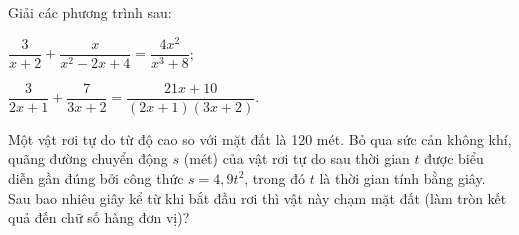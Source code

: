 \begin{practice}
\begin{questions}[series=SBT]
\begin{questions}
            \answerline
            \answerline
            \answerline
        \end{questions}

        \item Giải các phương trình sau:
        \begin{questions}
            \item $\dfrac{3}{x+2}+\dfrac{x}{x^2-2x+4}=\dfrac{4x^2}{x^3+8}$;

            \answerline
            \answerline
            \answerline
            \item $\dfrac{3}{2x+1}+\dfrac{7}{3x+2}=\dfrac{21x+10}{(2x+1)(3x+2)}$.

            \answerline
            \answerline
            \answerline
        \end{questions}

        \item Một vật rơi tự do từ độ cao so với mặt đất là 120 mét. Bỏ qua sức cản không khí, quãng đường chuyển động $s$ (mét) của vật rơi tự do sau thời gian $t$ được biểu diễn gần đúng bởi công thức $s=4{,}9t^2$, trong đó $t$ là thời gian tính bằng giây. Sau bao nhiêu giây kể từ khi bắt đầu rơi thì vật này chạm mặt đất (làm tròn kết quả đến chữ số hàng đơn vị)?

        \answerline
        \answerline
        \answerline
    \end{questions}
\end{practice}
